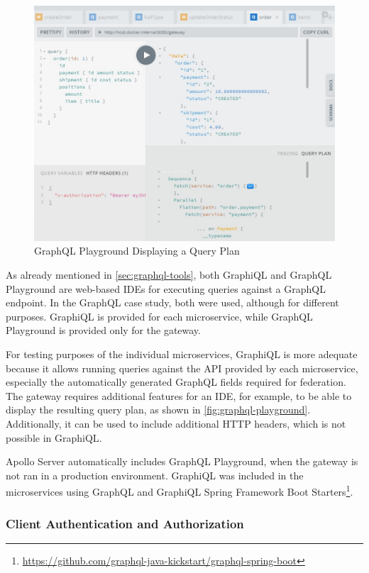 \begin{figure}[!b]
    \centering
    \includegraphics[width=\textwidth]{images/graphql-playground.png}
    \caption{GraphQL Playground Displaying a Query Plan}\label{fig:graphql-playground}
\end{figure}

As already mentioned in \autoref{sec:graphql-tools}, both GraphiQL and GraphQL Playground are web-based \acp{IDE} for executing queries against a GraphQL endpoint.
In the GraphQL case study, both were used, although for different purposes.
GraphiQL is provided for each microservice, while GraphQL Playground is provided only for the gateway.

For testing purposes of the individual microservices, GraphiQL is more adequate because it allows running queries against the \ac{API} provided by each microservice, especially the automatically generated GraphQL fields required for federation.
The gateway requires additional features for an \ac{IDE}, for example, to be able to display the resulting query plan, as shown in \autoref{fig:graphql-playground}.
Additionally, it can be used to include additional \ac{HTTP} headers, which is not possible in GraphiQL.%

Apollo Server automatically includes GraphQL Playground, when the gateway is not ran in a production environment.
GraphiQL was included in the microservices using GraphQL and GraphiQL Spring Framework Boot Starters\footnote{\url{https://github.com/graphql-java-kickstart/graphql-spring-boot}}.

\subsubsection{Client Authentication and Authorization}\label{sec:graphql-auth}

